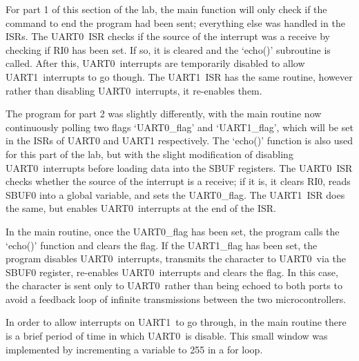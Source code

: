 \documentclass[12pt]{article}
\newcommand{\uz}{UART0}
\newcommand{\uo}{UART1}
\begin{document}
For part 1 of this section of the lab, the main function will only check if the command to end the program had been sent; everything else was handled in the ISRs. The \uz\ ISR checks if the source of the interrupt was a receive by checking if RI0 has been set. If so, it is cleared and the `echo()' subroutine is called. After this, \uz\ interrupts are temporarily disabled to allow \uo\ interrupts to go though. The \uo\ ISR has the same routine, however rather than disabling \uz\ interrupts, it re-enables them.

The program for part 2 was slightly differently, with the main routine now continuously polling two flags `UART0\_flag' and `UART1\_flag', which will be set in the ISRs of UART0 and UART1 respectively. The `echo()' function is also used for this part of the lab, but with the slight modification of disabling \uz\ interrupts before loading data into the SBUF registers. The \uz\ ISR checks whether the source of the interrupt is a receive; if it is, it clears RI0, reads SBUF0 into a global variable, and sets the \uz\_flag. The \uo\ ISR does the same, but enables \uz\ interrupts at the end of the ISR. 

In the main routine, once the \uz\_flag has been set, the program calls the `echo()' function and clears the flag. If the \uo\_flag has been set, the program disables \uz\ interrupts, transmits the character to \uz\ via the SBUF0 register, re-enables \uz\ interrupts and clears the flag. In this case, the character is sent only to \uz\ rather than being echoed to both ports to avoid a feedback loop of infinite transmissions between the two microcontrollers.

In order to allow interrupts on \uo\ to go through, in the main routine there is a brief period of time in which \uz\ is disable. This small window was implemented by incrementing a variable to 255 in a for loop.
\end{document}
